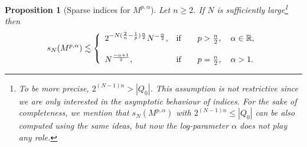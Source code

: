 \documentclass[11pt, a4paper,leqno]{amsart}
\theoremstyle{plain}
\newtheorem{proposition}{Proposition}
\numberwithin{equation}{section}
\theoremstyle{definition}
\theoremstyle{remark}
\def\R{\mathbb{R}}
\begin{document}
\begin{proposition}[Sparse indices for $M^{p, \alpha}$] \label{ThmSparseMorrey} Let $n\geq2$. If $N$ is sufficiently large\footnote{To be more precise, $2^{(N-1)n}>|Q_{0}|$. This assumption is not restrictive since we are only interested in the asymptotic behaviour of indices. For the sake of completeness, we mention that $s_N(M^{p, \alpha})$ with $2^{(N-1)n}\leq |Q_{0}|$ can be also computed using the same ideas, but now the log-parameter $\alpha$ does not play any role.} then
\[
s_{N}(M^{p, \alpha})\lesssim \left\{
\begin{array}
[c]{ll}%
 2^{-N(\frac{2}{n}%
-\frac{1}{p})\frac{n}{2}} N^{-\frac{\alpha}{2}}, & \text{if}\qquad p>\frac{n}{2}, \quad \alpha \in \R,\\
& \\
N^{\frac{-\alpha + 1}{2}}, &
\text{if}\qquad p = \frac{n}{2}, \quad \alpha > 1.
\end{array}
\right.
\]
\end{proposition}
\end{document}
